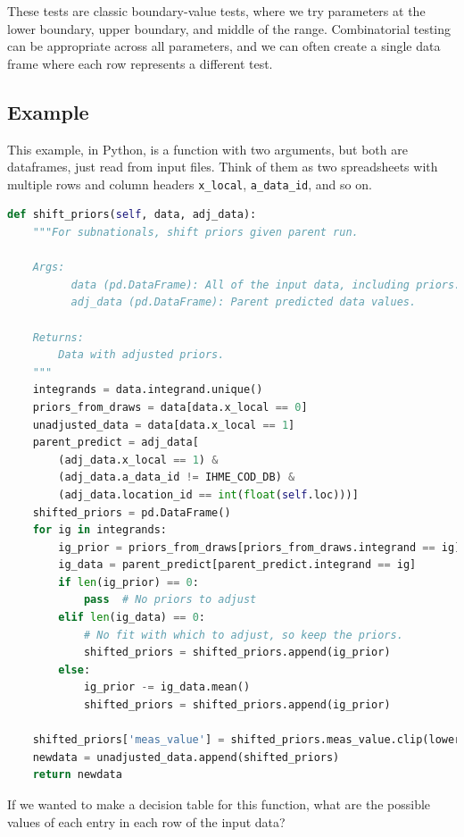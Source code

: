 \documentclass[fleqn,10pt]{olplainarticle}
\begin{document}
These tests are classic boundary-value tests, where
we try parameters at the lower boundary, upper boundary,
and middle of the range. Combinatorial testing can be appropriate
across all parameters, and we can often create a single data frame
where each row represents a different test.

\subsection{Example}
This example, in Python, is a function with two arguments, but both
are dataframes, just read from input files. Think of them as two spreadsheets
with multiple rows and column headers \lstinline!x_local!, \lstinline!a_data_id!,
and so on.
\begin{lstlisting}[language=Python]
def shift_priors(self, data, adj_data):
    """For subnationals, shift priors given parent run.

    Args:
          data (pd.DataFrame): All of the input data, including priors.
          adj_data (pd.DataFrame): Parent predicted data values.

    Returns:
        Data with adjusted priors.
    """
    integrands = data.integrand.unique()
    priors_from_draws = data[data.x_local == 0]
    unadjusted_data = data[data.x_local == 1]
    parent_predict = adj_data[
        (adj_data.x_local == 1) &
        (adj_data.a_data_id != IHME_COD_DB) &
        (adj_data.location_id == int(float(self.loc)))]
    shifted_priors = pd.DataFrame()
    for ig in integrands:
        ig_prior = priors_from_draws[priors_from_draws.integrand == ig]
        ig_data = parent_predict[parent_predict.integrand == ig]
        if len(ig_prior) == 0:
            pass  # No priors to adjust
        elif len(ig_data) == 0:
            # No fit with which to adjust, so keep the priors.
            shifted_priors = shifted_priors.append(ig_prior)
        else:
            ig_prior -= ig_data.mean()
            shifted_priors = shifted_priors.append(ig_prior)

    shifted_priors['meas_value'] = shifted_priors.meas_value.clip(lower=0)
    newdata = unadjusted_data.append(shifted_priors)
    return newdata
\end{lstlisting}

If we wanted to make a decision table for this function, what are
the possible values of each entry in each row of the input data?
\end{document}
